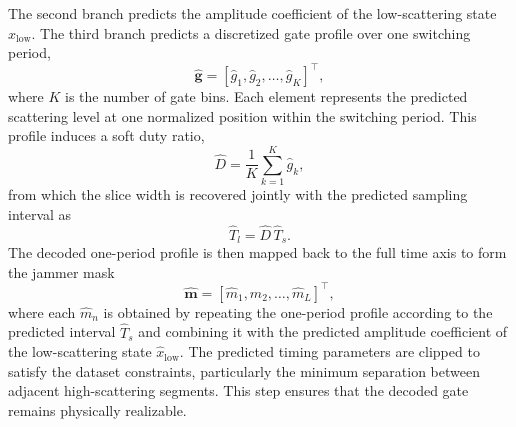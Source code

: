 \documentclass[conference]{IEEEtran}
\begin{document}
The second branch predicts the amplitude coefficient of the low-scattering state $\hat{x}_{\text{low}}$. The third branch predicts a discretized gate profile over one switching period,
\begin{equation}
\hat{\mathbf{g}}=
[\hat{g}_1,\hat{g}_2,\ldots,\hat{g}_K]^\top,
\end{equation}
where $K$ is the number of gate bins. Each element represents the predicted scattering level at one normalized position within the switching period. This profile induces a soft duty ratio,
\begin{equation}
\hat{D}=\frac{1}{K}\sum_{k=1}^{K}\hat{g}_k,
\end{equation}
from which the slice width is recovered jointly with the predicted sampling interval as
\begin{equation}
\hat{T}_l=\hat{D}\,\hat{T}_s.
\end{equation}
The decoded one-period profile is then mapped back to the full time axis to form the jammer mask
\begin{equation}
\hat{\mathbf m}=[\hat{m}_1,\hat{m}_2,\ldots,\hat{m}_L]^\top,
\end{equation}
where each $\hat{m}_n$ is obtained by repeating the one-period profile according to the predicted interval $\hat{T}_s$ and combining it with the predicted amplitude coefficient of the low-scattering state $\hat{x}_{\text{low}}$. The predicted timing parameters are clipped to satisfy the dataset constraints, particularly the minimum separation between adjacent high-scattering segments. This step ensures that the decoded gate remains physically realizable.
\end{document}
